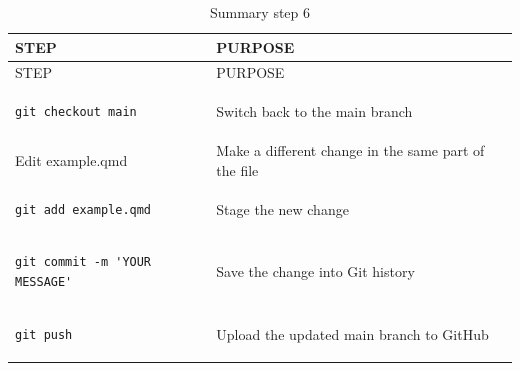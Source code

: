 \documentclass[
  11pt,
  a4paper,
]{article}
\begin{document}
\begin{longtable}[]{@{}
  >{\raggedright\arraybackslash}p{}
  >{\raggedright\arraybackslash}p{}@{}}
\caption{Summary step 6}\tabularnewline
\toprule\noalign{}
\begin{minipage}[b]{\linewidth}\raggedright
STEP
\end{minipage} & \begin{minipage}[b]{\linewidth}\raggedright
PURPOSE
\end{minipage} \\
\midrule\noalign{}
\endfirsthead
\toprule\noalign{}
\begin{minipage}[b]{\linewidth}\raggedright
STEP
\end{minipage} & \begin{minipage}[b]{\linewidth}\raggedright
PURPOSE
\end{minipage} \\
\midrule\noalign{}
\endhead
\bottomrule\noalign{}
\endlastfoot
\begin{minipage}[t]{\linewidth}\raggedright
\begin{verbatim}
git checkout main
\end{verbatim}
\end{minipage} & Switch back to the main branch \\
Edit example.qmd & Make a different change in the same part of the
file \\
\begin{minipage}[t]{\linewidth}\raggedright
\begin{verbatim}
git add example.qmd
\end{verbatim}
\end{minipage} & Stage the new change \\
\begin{minipage}[t]{\linewidth}\raggedright
\begin{verbatim}
git commit -m 'YOUR MESSAGE'
\end{verbatim}
\end{minipage} & Save the change into Git history \\
\begin{minipage}[t]{\linewidth}\raggedright
\begin{verbatim}
git push
\end{verbatim}
\end{minipage} & Upload the updated main branch to GitHub \\
\end{longtable}
\end{document}
